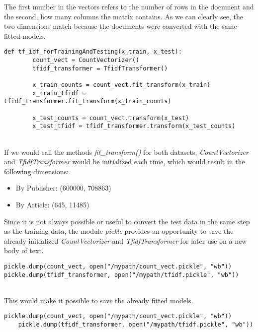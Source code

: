 \documentclass[a4paper, 11pt,titlepage,oneside,openany]{book}
\begin{document}
The first number in the vectors refers to the number of rows in the document and the second, how many columns the matrix contains. As we can clearly see, the two dimensions match because the documents were converted with the same fitted models. \\
\noindent
\begin{minipage}{\linewidth}
	\begin{lstlisting}[frame=single]
	def tf_idf_forTrainingAndTesting(x_train, x_test):
		count_vect = CountVectorizer()
		tfidf_transformer = TfidfTransformer()
	
		x_train_counts = count_vect.fit_transform(x_train)
		x_train_tfidf = tfidf_transformer.fit_transform(x_train_counts)
	
		x_test_counts = count_vect.transform(x_test)
		x_test_tfidf = tfidf_transformer.transform(x_test_counts)
	\end{lstlisting}
\end{minipage} \\
\noindent If we would call the methods \textit{fit\_transform()} for both datasets, \textit{CountVectorizer} and \textit{TfidfTransformer} would be initialized each time, which would result in the following dimensions:
\begin{itemize}
	\item By Publisher: (600000, 708863)
	\item By Article: (645, 11485)	
\end{itemize}
\noindent Since it is not always possible or useful to convert the test data in the same step as the training data, the module \textit{pickle} provides an opportunity to save the already initialized \textit{CountVectorizer} and \textit{TfidfTransformer} for later use on a new body of text. \\
\noindent
\begin{minipage}{\linewidth}
	\begin{lstlisting}[frame=single]
pickle.dump(count_vect, open("/mypath/count_vect.pickle", "wb"))
pickle.dump(tfidf_transformer, open("/mypath/tfidf.pickle", "wb"))
	\end{lstlisting}
\end{minipage} \\
This would make it possible to save the already fitted models. \\
\noindent
\begin{minipage}{\linewidth}
	\begin{lstlisting}[frame=single]
	pickle.dump(count_vect, open("/mypath/count_vect.pickle", "wb"))
	pickle.dump(tfidf_transformer, open("/mypath/tfidf.pickle", "wb"))
	\end{lstlisting}
\end{minipage} \\
\end{document}
